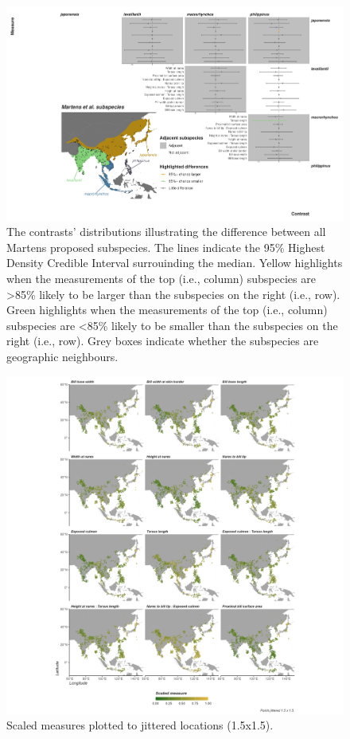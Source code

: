 \documentclass[10pt,a4paper]{article}
\begin{document}
\begin{figure}
\includegraphics[width=0.9\linewidth]{../Figures/martSpecies_HDCI_contrasts} \caption{The contrasts' distributions illustrating the difference between all Martens proposed subspecies. The lines indicate the 95\% Highest Density Credible Interval surrouinding the median. Yellow highlights when the measurements of the top (i.e., column) subspecies are >85\% likely to be larger than the subspecies on the right (i.e., row). Green highlights when the measurements of the top (i.e., column) subspecies are <85\% likely to be smaller than the subspecies on the right (i.e., row). Grey boxes indicate whether the subspecies are geographic neighbours.}\label{fig:martContrasts}
\end{figure}

\begin{figure}
\includegraphics[width=0.9\linewidth]{../Figures/measuresMap} \caption{Scaled measures plotted to jittered locations (1.5x1.5).}\label{fig:measuresMap}
\end{figure}
\end{document}
